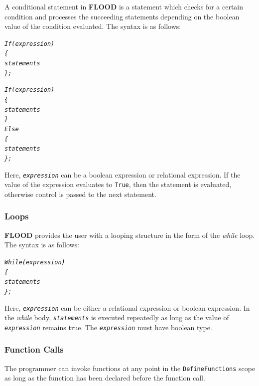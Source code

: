 \documentclass[12pt]{report}
\begin{document}
A conditional statement in \textbf{FLOOD} is a statement which checks for a certain condition and processes the succeeding statements depending on the boolean value of the condition evaluated. The syntax is as follows:

\begin{alltt}\begin{singlespace}
            \textit{If (expression)
            \{
                statements
            \};}


            \textit{If (expression)
            \{
                statements
            \}
            Else
            \{
                statements
            \};}\end{singlespace}
\end{alltt}

Here, \textit{\texttt{expression}} can be a boolean expression or relational expression. If the value of the expression evaluates to \texttt{True}, then the statement is evaluated, otherwise control is passed to the next statement.

\subsubsection{Loops}

\textbf{FLOOD} provides the user with a looping structure in the form of the \textit{while} loop. The syntax is as follows:

\begin{alltt}\begin{singlespace}
            \textit{While (expression)
            \{
                statements
            \};}\end{singlespace}
\end{alltt}

Here, \textit{\texttt{expression}} can be either a relational expression or boolean expression. In the \textit{while} body, \textit{\texttt{statements}} is executed repeatedly as long as the value of \textit{\texttt{expression}} remains true. The \textit{\texttt{expression}} must have boolean type.

\subsubsection{Function Calls}

The programmer can invoke functions at any point in the \texttt{DefineFunctions} scope as long as the function has been declared before the function call. 
\end{document}
